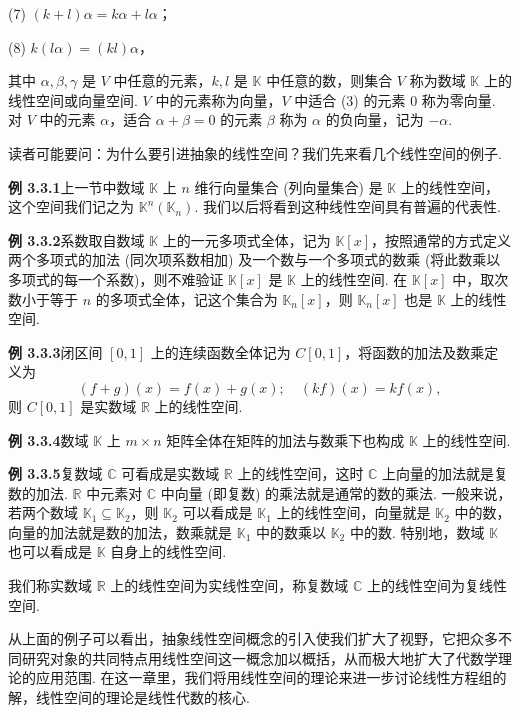 \documentclass[UTF8, 12pt, fontset=fandol, oneside]{ctexart}
\begin{document}
(7) $(k+l)\alpha=k\alpha+l\alpha$；

(8) $k(l\alpha)=(kl)\alpha$，

其中 $\alpha,\beta,\gamma$ 是 $V$ 中任意的元素，$k,l$ 是 $\mathbb{K}$ 中任意的数，则集合 $V$ 称为数域 $\mathbb{K}$ 上的线性空间或向量空间. $V$ 中的元素称为向量，$V$ 中适合 (3) 的元素 $0$ 称为零向量. 对 $V$ 中的元素 $\alpha$，适合 $\alpha+\beta=0$ 的元素 $\beta$ 称为 $\alpha$ 的负向量，记为 $-\alpha$.

读者可能要问：为什么要引进抽象的线性空间？我们先来看几个线性空间的例子.

\noindent\textbf{例 3.3.1}\quad 上一节中数域 $\mathbb{K}$ 上 $n$ 维行向量集合 (列向量集合) 是 $\mathbb{K}$ 上的线性空间，这个空间我们记之为 $\mathbb{K}^n(\mathbb{K}_n)$. 我们以后将看到这种线性空间具有普遍的代表性.

\noindent\textbf{例 3.3.2}\quad 系数取自数域 $\mathbb{K}$ 上的一元多项式全体，记为 $\mathbb{K}[x]$，按照通常的方式定义两个多项式的加法 (同次项系数相加) 及一个数与一个多项式的数乘 (将此数乘以多项式的每一个系数)，则不难验证 $\mathbb{K}[x]$ 是 $\mathbb{K}$ 上的线性空间. 在 $\mathbb{K}[x]$ 中，取次数小于等于 $n$ 的多项式全体，记这个集合为 $\mathbb{K}_n[x]$，则 $\mathbb{K}_n[x]$ 也是 $\mathbb{K}$ 上的线性空间.

\noindent\textbf{例 3.3.3}\quad 闭区间 $[0,1]$ 上的连续函数全体记为 $C[0,1]$，将函数的加法及数乘定义为
\[
(f+g)(x)=f(x)+g(x);\quad (kf)(x)=kf(x),
\]
则 $C[0,1]$ 是实数域 $\mathbb{R}$ 上的线性空间.

\noindent\textbf{例 3.3.4}\quad 数域 $\mathbb{K}$ 上 $m\times n$ 矩阵全体在矩阵的加法与数乘下也构成 $\mathbb{K}$ 上的线性空间.

\noindent\textbf{例 3.3.5}\quad 复数域 $\mathbb{C}$ 可看成是实数域 $\mathbb{R}$ 上的线性空间，这时 $\mathbb{C}$ 上向量的加法就是复数的加法. $\mathbb{R}$ 中元素对 $\mathbb{C}$ 中向量 (即复数) 的乘法就是通常的数的乘法. 一般来说，若两个数域 $\mathbb{K}_1\subseteq\mathbb{K}_2$，则 $\mathbb{K}_2$ 可以看成是 $\mathbb{K}_1$ 上的线性空间，向量就是 $\mathbb{K}_2$ 中的数，向量的加法就是数的加法，数乘就是 $\mathbb{K}_1$ 中的数乘以 $\mathbb{K}_2$ 中的数. 特别地，数域 $\mathbb{K}$ 也可以看成是 $\mathbb{K}$ 自身上的线性空间.

我们称实数域 $\mathbb{R}$ 上的线性空间为实线性空间，称复数域 $\mathbb{C}$ 上的线性空间为复线性空间.

从上面的例子可以看出，抽象线性空间概念的引入使我们扩大了视野，它把众多不同研究对象的共同特点用线性空间这一概念加以概括，从而极大地扩大了代数学理论的应用范围. 在这一章里，我们将用线性空间的理论来进一步讨论线性方程组的解，线性空间的理论是线性代数的核心.
\end{document}
